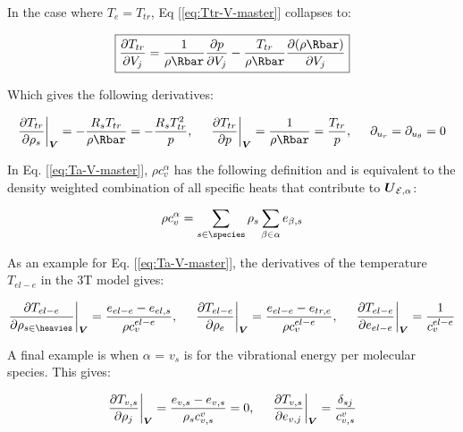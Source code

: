 \documentclass[10pt]{article}
\begin{document}
\begin{flushleft}
In the case where $T_e = T_{tr}$, Eq [\ref{eq:Ttr-V-master}] collapses to:

\begin{equation}
    \boxed{\pd{T_{tr}}{V_j} = \frac{1}{\rho \Rbar} \pd{p}{V_j} - \frac{T_{tr}}{\rho \Rbar} \pd{(\rho \Rbar)}{V_j}}
\end{equation}

 Which gives the following derivatives:

\begin{equation}
    \pd{T_{tr}}{\rho_s} \bigg|_{\bigV} = - \frac{R_s T_{tr}}{\rho \Rbar} = - \frac{R_s T_{tr}^2}{p}, \hspace{5mm} \pd{T_{tr}}{p} \bigg|_{\bigV} = \frac{1}{\rho \Rbar} = \frac{T_{tr}}{p}, \hspace{5mm} \partial_{u_r} = \partial_{u_\theta} = 0
\end{equation}

In Eq. [\ref{eq:Ta-V-master}], $\rho c_v^\alpha$ has the following definition and is equivalent to the density weighted combination of all specific heats that contribute to $\boldsymbol{U}_{\mathcal{E},\alpha}$: 

\begin{equation*}
    \rho c_v^\alpha = \sum_{s \in \species} \rho_s \sum_{\beta \in \alpha} e_{\beta,s}
\end{equation*}

As an example for Eq. [\ref{eq:Ta-V-master}], the derivatives of the temperature $T_{el-e}$ in the 3T model gives:

\begin{equation*}
    \pd{T_{el-e}}{\rho_{s \in \heavies}} \bigg|_{\bigV} = \frac{e_{el-e} - e_{el,s}}{\rho c_v^{el-e}} ,\hspace{5mm} \pd{T_{el-e}}{\rho_e} \bigg|_{\bigV} = \frac{e_{el-e} - e_{tr,e}}{\rho c_{v}^{el-e}}, \hspace{5mm} \pd{T_{el-e}}{e_{el-e}} \bigg|_{\bigV} = \frac{1}{c_v^{el-e}}
\end{equation*}

A final example is when $\alpha$ = $v_s$ is for the vibrational energy per molecular species. This gives:

\begin{equation}
    \frac{\partial T_{v,s}}{\partial \rho_j} \bigg|_{\boldsymbol{V}} = \frac{e_{v,s} - e_{v,s}}{\rho_s c_{v,s}^v} = 0, \hspace{5mm} \frac{\partial T_{v,s}}{\partial e_{v,j}} \bigg|_{\boldsymbol{V}} = \frac{\delta_{sj}}{c_{v,s}^v}
\end{equation}


\end{flushleft}
\end{document}
